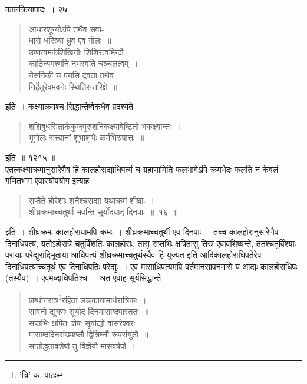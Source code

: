 \documentclass[11pt, openany]{book}
\begin{document}
{\newpage

\vspace{3cm} \hspace{4cm} कालक्रियापादः~।\hspace{4cm} २७ 

\begin{quote}
{\qt आधारशून्योऽपि तथैव सर्वा-\\
धारो धरित्र्या ध्रुव एव गोलः~॥\\
उष्णत्वमर्कशिखिनोः शिशिरत्वमिन्दौ\\
काठिन्यमश्मनि नभस्वति चञ्चलत्वम्~।\\
नैसर्गिकी च पयसि द्रवता तथैव\\
निर्हेतुरेवमवनेः स्थितिरन्तरिक्षे~॥}
\end{quote}


\noindent इति~। कक्ष्याक्रमश्च सिद्धान्तेष्वेकधैव प्रदर्श्यते\textendash

\begin{quote}
{\qt शशिबुधसितार्ककुजगुरुशनिकक्ष्यावेष्टितो भकक्ष्यान्तः~।\\
भूगोलः सत्त्वानां शुभाशुभैः कर्मभिरुपात्तः~॥}
\end{quote}
\noindent इति~॥ १२\textendash१५ ॥ \\

\noindent एतत्कक्ष्याक्रमानुसारेणैव हि कालहोराद्याधिपत्यं च ग्रहाणामिति फलभागेऽपि क्रमभेदः फलति न केवलं गणितभाग एवास्योपयोग इत्याह\textendash 

\begin{quote}
{\ab सप्तैते होरेशाः शनैश्चराद्या यथाक्रमं शीघ्राः~।\\
शीघ्रक्रमाच्चतुर्था भवन्ति सूर्योदयाद् दिनपाः~॥~१६~॥}
\end{quote}

\noindent इति~। शीघ्रक्रमः कालहोरायामपि क्रमः~। शीघ्रक्रमाच्चतुर्थी एव दिनपाः~। तच्च कालहोरानुसारेणैव दिनाधिपत्यं, यतोऽहोरात्रे चतुर्विंशतिः कालहोराः, तासु सप्तभिः क्षपितासु तिस्र एवावशिष्यन्ते, ततश्चतुर्विंश्याः परायाः परेद्युरादिभूताया आधिपत्यं शीघ्रक्रमाच्चतुर्थस्यैव हि युज्यत इति आदिकालहोराधिपतेरेव दिनाधिपत्याच्चतुर्थ एव दिनाधिपतिः परेद्युः~। एवं मासाधिपत्यमपि वर्तमानसावनमासे य आद्यः कालहोराधिपः (तस्यैव)~। एवमब्दाधिपतिश्च~। अत एवाह सूर्यसिद्धान्ते\textendash 

\begin{quote}
{\qt लब्धोनरात्र\renewcommand{\thefootnote}{१}\footnote{'त्रि' क. पाठः}रहिता लङ्कायामार्धरात्रिकः~।\\
सावनो द्युगणः सूर्याद् दिनमासाब्दपास्ततः~॥\\
सप्तभिः क्षपितः शेषः सूर्याद्यो वासरेश्वरः~।\\
मासाब्ददिनसंख्याप्तौ द्वित्रिघ्नौ रूपसंयुतौ~॥\\
सप्तोद्धृतावशेषौ तु विज्ञेयौ मासवर्षपौ~।}
\end{quote}

}
\end{document}
